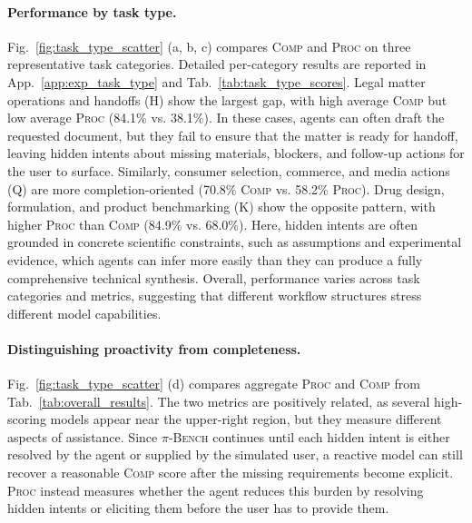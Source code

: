 \documentclass{llmxive}
\providecommand{\bench}{\textsc{$\pi$-Bench}}
\begin{document}
\paragraph{Performance by task type.}
Fig.~\ref{fig:task_type_scatter} ({a, b, c}) compares \textsc{Comp} and \textsc{Proc} on three representative task categories. Detailed per-category results are reported in App.~\ref{app:exp_task_type} and Tab.~\ref{tab:task_type_scores}. Legal matter operations and handoffs (H) show the largest gap, with high average \textsc{Comp} but low average \textsc{Proc} (84.1\% vs. 38.1\%). In these cases, agents can often draft the requested document, but they fail to ensure that the matter is ready for handoff, leaving hidden intents about missing materials, blockers, and follow-up actions for the user to surface. Similarly, consumer selection, commerce, and media actions (Q) are more completion-oriented (70.8\% \textsc{Comp} vs. 58.2\% \textsc{Proc}). Drug design, formulation, and product benchmarking (K) show the opposite pattern, with higher \textsc{Proc} than \textsc{Comp} (84.9\% vs. 68.0\%). Here, hidden intents are often grounded in concrete scientific constraints, such as assumptions and experimental evidence, which agents can infer more easily than they can produce a fully comprehensive technical synthesis. Overall, performance varies across task categories and metrics, suggesting that different workflow structures stress different model capabilities.

\paragraph{Distinguishing proactivity from completeness.}
Fig.~\ref{fig:task_type_scatter} ({d}) compares aggregate \textsc{Proc} and \textsc{Comp} from Tab.~\ref{tab:overall_results}. The two metrics are positively related, as several high-scoring models appear near the upper-right region, but they measure different aspects of assistance. Since {\bench} continues until each hidden intent is either resolved by the agent or supplied by the simulated user, a reactive model can still recover a reasonable \textsc{Comp} score after the missing requirements become explicit. \textsc{Proc} instead measures whether the agent reduces this burden by resolving hidden intents or eliciting them before the user has to provide them.
\end{document}
